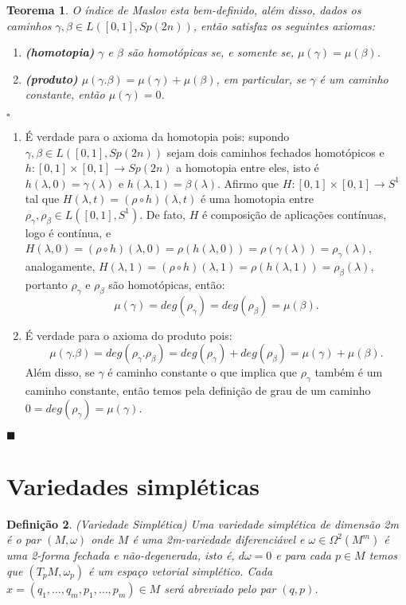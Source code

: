 \documentclass[12pt]{book}
\newtheorem{teorema}{Teorema}[section]
\newtheorem{definicao}[teorema]{Definição}
\newenvironment{prova}[1]{$\square$ #1}{\hfill$\blacksquare$}
\newcommand{\caminhosfechadoscirculo}[2]{L([#1,#2], S^{1})}
\newcommand{\caminhosfechadosSp}[2]{L([#1,#2], \gruposimpletico{2n})}
\newcommand{\gruposimpletico}[1]{Sp(#1)}
\begin{document}
	\begin{teorema}\label{teorema_indice_maslov}
		O índice de Maslov esta bem-definido, além disso, dados os caminhos $\gamma, \beta \in \caminhosfechadosSp{0}{1}$, então satisfaz os seguintes axiomas:
		\begin{enumerate}
			\item \textbf{(homotopia)} $\gamma$ e $\beta$ são homotópicas se, e somente se, $\mu(\gamma)=\mu(\beta)$.
			
			\item \textbf{(produto)} $\mu(\gamma.\beta) = \mu(\gamma)+\mu(\beta)$, em particular, se $\gamma$ é um caminho constante, então $\mu(\gamma) = 0$.
		\end{enumerate}
	\end{teorema}
	\begin{prova}
		\begin{enumerate}
			\item É verdade para o axioma da homotopia pois: supondo $\gamma, \beta \in \caminhosfechadosSp{0}{1}$ sejam dois caminhos fechados homotópicos e $h:[0,1]\times [0,1]\to \gruposimpletico{2n}$ a homotopia entre eles, isto é $h(\lambda, 0) = \gamma(\lambda)$ e $h(\lambda, 1) = \beta(\lambda)$. Afirmo que $H:[0,1] \times [0,1] \to S^{1}$ tal que $H(\lambda, t) = (\rho \circ h)(\lambda,t)$ é uma homotopia entre $\rho_{\gamma}, \rho_{\beta} \in \caminhosfechadoscirculo{0}{1}$. De fato, $H$ é composição de aplicações contínuas, logo é contínua, e $H(\lambda, 0) = (\rho \circ h)(\lambda,0) = \rho (h(\lambda,0))= \rho (\gamma(\lambda)) = \rho_{\gamma}(\lambda)$, analogamente, $H(\lambda, 1) = (\rho \circ h)(\lambda, 1) = \rho (h(\lambda,1))= \rho_{\beta}(\lambda)$, portanto $\rho_{\gamma}$ e $\rho_{\beta}$ são homotópicas, então:
			$$
			\mu(\gamma) = deg(\rho_{\gamma}) = deg(\rho_{\beta}) = \mu(\beta).
			$$
			\item É verdade para o axioma do produto pois:
			$$
			\mu(\gamma.\beta) = deg(\rho_{\gamma}.\rho_{\beta}) = deg(\rho_{\gamma})+deg(\rho_{\beta}) = \mu(\gamma)+\mu(\beta).
			$$	
			Além disso, se $\gamma$ é caminho constante o que implica que $\rho_{\gamma}$ também é um caminho constante, então temos pela definição de grau de um caminho $0=deg(\rho_{\gamma}) = \mu(\gamma)$.
		\end{enumerate}
	\end{prova}
		
	\section{Variedades simpléticas}
	\begin{definicao}
		(Variedade Simplética) Uma variedade simplética de dimensão 2m é o par $(M, \omega)$ onde $M$ é uma 2m-variedade diferenciável e $\omega \in \Omega^{2}(M^{m})$ é uma 2-forma fechada e não-degenerada, isto é, $d\omega = 0$ e para cada $p \in M$ temos que $(T_{p}M, \omega_{p})$ é um espaço vetorial simplético. Cada $x = (q_{1}, \dots, q_{m}, p_{1}, \dots, p_{m}) \in M$  será abreviado pelo par $(q,p)$.
	\end{definicao}
	
\end{document}
